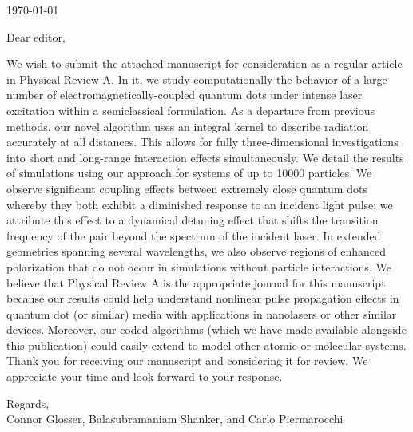 \documentclass{tufte-handout}
\begin{document}
\hfill\today\\
\vspace{0.2cm}

\noindent Dear editor, \\
\vspace{0.2cm}

We wish to submit the attached manuscript for consideration as a regular article in Physical Review A.
In it, we study computationally the behavior of a large number of electromagnetically-coupled quantum dots under intense laser excitation within a semiclassical formulation.
As a departure from previous methods, our novel algorithm uses an integral kernel to describe radiation accurately at all distances.
This allows for fully three-dimensional investigations into short and long-range interaction effects simultaneously.
We detail the results of simulations using our approach for systems of up to \num{10000} particles.
We observe significant coupling effects between extremely close quantum dots whereby they both exhibit a diminished response to an incident light pulse; we attribute this effect to a dynamical detuning effect that shifts the transition frequency of the pair beyond the spectrum of the incident laser.
In extended geometries spanning several wavelengths, we also observe regions of enhanced polarization that do not occur in simulations without particle interactions.
We believe that Physical Review A is the appropriate journal for this manuscript because our results could help understand nonlinear pulse propagation effects in quantum dot (or similar) media with applications in nanolasers or other similar devices.
Moreover, our coded algorithms (which we have made available alongside this publication) could easily extend to model other atomic or molecular systems.
Thank you for receiving our manuscript and considering it for review.
We appreciate your time and look forward to your response.

\vspace{0.6in}
\noindent Regards,\\
\noindent Connor Glosser, Balasubramaniam Shanker, and Carlo Piermarocchi
\end{document}
